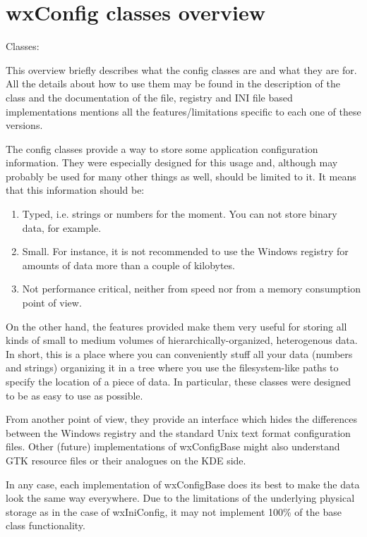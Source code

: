 \section{wxConfig classes overview}\label{wxconfigoverview}

Classes: 

This overview briefly describes what the config classes are and what they are
for. All the details about how to use them may be found in the description of
the  class and the documentation of the
file, registry and INI file based implementations mentions all the
features/limitations specific to each one of these versions.

The config classes provide a way to store some application configuration
information. They were especially designed for this usage and, although may
probably be used for many other things as well, should be limited to it. It
means that this information should be:

\begin{enumerate}
\item Typed, i.e. strings or numbers for the moment. You can not store
binary data, for example.
\item Small. For instance, it is not recommended to use the Windows
registry for amounts of data more than a couple of kilobytes.
\item Not performance critical, neither from speed nor from a memory
consumption point of view.
\end{enumerate}

On the other hand, the features provided make them very useful for storing all
kinds of small to medium volumes of hierarchically-organized, heterogenous
data. In short, this is a place where you can conveniently stuff all your data
(numbers and strings) organizing it in a tree where you use the
filesystem-like paths to specify the location of a piece of data. In
particular, these classes were designed to be as easy to use as possible.

From another point of view, they provide an interface which hides the
differences between the Windows registry and the standard Unix text format
configuration files. Other (future) implementations of wxConfigBase might also
understand GTK resource files or their analogues on the KDE side.

In any case, each implementation of wxConfigBase does its best to
make the data look the same way everywhere. Due
to the limitations of the underlying physical storage as in the case of
wxIniConfig, it may not implement 100\% of the base class functionality.


